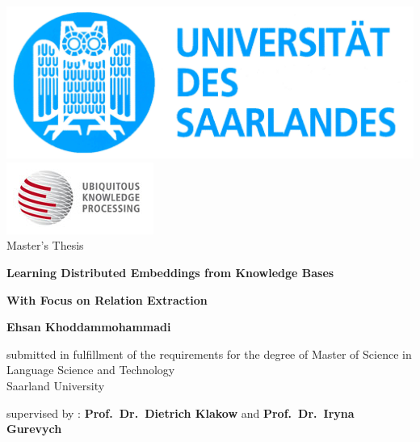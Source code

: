 \documentclass[a4paper, 11pt]{book}
\begin{document}
\frontmatter %

\thispagestyle{empty}
\begin{center}
\includegraphics{logo-saarbr-small.jpg}
\includegraphics{ukp-logo.jpg} \\
\vspace{2 cm}
\large{
Master's Thesis \\
}
\end{center}


\vspace{2 cm}
\centerline{\LARGE\textbf{Learning Distributed Embeddings from Knowledge Bases}}
\centerline{\LARGE\textbf{With Focus on Relation Extraction}}



\vspace{2 cm}
\begin{center}
\textbf{Ehsan Khoddammohammadi \\}
\end{center}
\begin{center}
\large{
submitted in fulfillment of the requirements
for the degree of Master of Science in Language Science and Technology\\
Saarland University\\

}
\end{center}
\vspace{1 cm}
\begin{center}
\large{
supervised by : \textbf{Prof.~Dr.~Dietrich Klakow} and \textbf{Prof.~Dr.~Iryna
Gurevych}\\
}
\end{center}

\newpage
\end{document}
